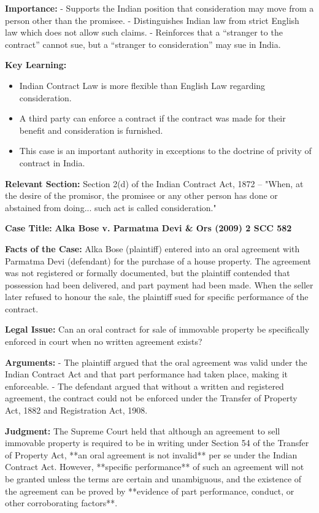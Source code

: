 \documentclass[12pt,a4paper]{book}
\begin{document}
\textbf{Importance:}  
- Supports the Indian position that consideration may move from a person other than the promisee.
- Distinguishes Indian law from strict English law which does not allow such claims.
- Reinforces that a “stranger to the contract” cannot sue, but a “stranger to consideration” may sue in India.

\textbf{Key Learning:}
\begin{itemize}
    \item Indian Contract Law is more flexible than English Law regarding consideration.
    \item A third party can enforce a contract if the contract was made for their benefit and consideration is furnished.
    \item This case is an important authority in exceptions to the doctrine of privity of contract in India.
\end{itemize}

\textbf{Relevant Section:}  
Section 2(d) of the Indian Contract Act, 1872 – "When, at the desire of the promisor, the promisee or any other person has done or abstained from doing... such act is called consideration."

\vspace{1cm}
\clearpage

\textbf{Case Title:} \textbf{Alka Bose v. Parmatma Devi \& Ors (2009) 2 SCC 582}

\textbf{Facts of the Case:}  
Alka Bose (plaintiff) entered into an oral agreement with Parmatma Devi (defendant) for the purchase of a house property. The agreement was not registered or formally documented, but the plaintiff contended that possession had been delivered, and part payment had been made. When the seller later refused to honour the sale, the plaintiff sued for specific performance of the contract.

\textbf{Legal Issue:}  
Can an oral contract for sale of immovable property be specifically enforced in court when no written agreement exists?

\textbf{Arguments:}
- The plaintiff argued that the oral agreement was valid under the Indian Contract Act and that part performance had taken place, making it enforceable.
- The defendant argued that without a written and registered agreement, the contract could not be enforced under the Transfer of Property Act, 1882 and Registration Act, 1908.

\textbf{Judgment:}  
The Supreme Court held that although an agreement to sell immovable property is required to be in writing under Section 54 of the Transfer of Property Act, **an oral agreement is not invalid** per se under the Indian Contract Act. However, **specific performance** of such an agreement will not be granted unless the terms are certain and unambiguous, and the existence of the agreement can be proved by **evidence of part performance, conduct, or other corroborating factors**.
\end{document}
